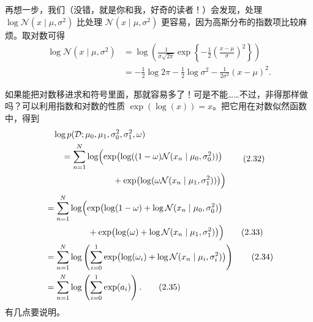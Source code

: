 再想一步，我们（没错，就是你和我，好奇的读者！）会发现，处理 $\log\mathcal{N}(x\mid\mu,\sigma^2)$ 比处理 $\mathcal{N}(x\mid\mu,\sigma^2)$ 更容易，因为高斯分布的指数项比较麻烦。取对数可得
\begin{align}
\log\mathcal{N}(x\mid\mu,\sigma^2)
 &= \log\!\left(\frac{1}{\sigma\sqrt{2\pi}}
       \exp\!\left\{-\frac12\left(\frac{x-\mu}{\sigma}\right)^2\right\}\right)
                      \tag{2.30}\label{eq:02-30}\\
 &= -\frac12\log 2\pi-\frac12\log\sigma^2
                     -\frac{1}{2\sigma^2}(x-\mu)^2.
                      \tag{2.31}\label{eq:02-31}
\end{align}

如果能把对数移进求和符号里面，那就容易多了！可是不能……不过，非得那样做吗？可以利用指数和对数的性质 $\exp(\log(x))=x$。把它用在对数似然函数中，得到
\begin{equation}
\begin{aligned}
&\log p(\mathcal{D};\mu_0,\mu_1,\sigma_0^2,\sigma_1^2,\omega)\\
&\quad=\sum_{n=1}^{N}\log\Bigl(
  \exp\bigl(\log((1-\omega)\mathcal{N}(x_n\mid\mu_0,\sigma_0^2))\bigr)\\
&\hspace{7em}+\exp\bigl(\log(\omega\mathcal{N}(x_n\mid\mu_1,\sigma_1^2))\bigr)\Bigr)
\end{aligned}
\tag{2.32}\label{eq:02-32}
\end{equation}
\begin{align}
&=\sum_{n=1}^{N}\log\Bigl(
    \exp\bigl(\log(1-\omega)+\log\mathcal{N}(x_n\mid\mu_0,\sigma_0^2)\bigr)
    \notag\\
&\hspace{5em}+\exp\bigl(\log(\omega)+\log\mathcal{N}(x_n\mid\mu_1,\sigma_1^2)\bigr)
    \Bigr) \tag{2.33}\label{eq:02-33}\\
&=\sum_{n=1}^{N}\log\left(\sum_{i=0}^{1}
  \exp\bigl(\log(\omega_i)+\log\mathcal{N}(x_n\mid\mu_i,\sigma_i^2)\bigr)\right)
     \tag{2.34}\label{eq:02-34}\\
&=\sum_{n=1}^{N}\log\left(\sum_{i=0}^{1}\exp(a_i)\right).
     \tag{2.35}\label{eq:02-35}
\end{align}
有几点要说明。
